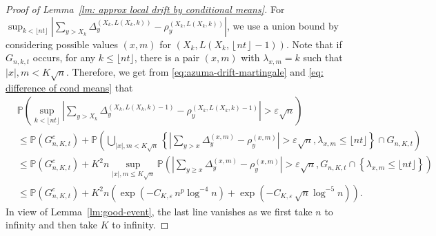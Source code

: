 \documentclass[EJP]{ejpecp} %
\newcommand{\abs}[1]{\left\vert #1 \right\vert}
\begin{document}
\begin{proof}[Proof of Lemma~\ref{lm: approx local drift by conditional means}]
For $\sup_{k <\lfloor nt \rfloor} \left| \sum_{y > X_k} \Delta_y^{\left(X_k,L(X_k, k)\right)} - \rho_y^{\left(X_k,L(X_k, k)\right)} \right|$, we use a union bound by considering possible values $(x,m)$ for $\left(X_k, L\left(X_k, \left\lfloor nt  \right\rfloor - 1\right)\right)$. Note that if $G_{n,k,t}$ occurs, for any $k\leq \lfloor nt \rfloor$, there is a pair $(x,m)$ with $\lambda_{x,m}=k$ such that $\abs{x},m <K\sqrt{n}$. Therefore, we get from \eqref{eq:azuma-drift-martingale} and \eqref{eq: difference of cond means} that 
\begin{align*}
	& \mathbb{P}\left( \sup_{k <\lfloor nt \rfloor} \left| \sum_{y > X_k} 
	\Delta_y^{\left(X_k,L(X_k, k)-1\right)} - \rho_y^{\left(X_k,L(X_k, k)-1\right)}
	\right| > \varepsilon \sqrt{n}  \right) \\
	&\le \mathbb{P}(G_{n, K, t}^c) + \mathbb{P}\left( \bigcup_{|x|, m < K \sqrt{n} } \left\{  \left| \sum_{y > x} \Delta_y^{(x,m)} - \rho_y^{(x,m)} \right|  > \varepsilon \sqrt{n},  \lambda_{x,m} \leq\lfloor nt \rfloor \right\} \cap G_{n,K,t} \right) \\
	&\le \mathbb{P}(G_{n, K, t}^c) + K^2 n \sup _{|x|, m \le  K \sqrt{n} }
	\mathbb{P}\left( \left| \sum_{y \ge x} \Delta_y^{(x,m)} - \rho_y^{(x,m)} \right|  > \varepsilon \sqrt{n} , G_{n,K,t}\cap \left\{\lambda_{x,m} \leq\lfloor nt \rfloor \right\}  \right) \\
	&\le \mathbb{P}(G_{n, K, t}^c) + K^2 n \left( \exp\left( - C_{K, \varepsilon} \, n^{p } \log^{-4} n \right) + \exp\left( - C_{K, \varepsilon} \, \sqrt{n}  \log^{-5} n \right)\right) 
	.\end{align*}
In view of Lemma~\ref{lm:good-event}, the last line vanishes as we first take $n$ to infinity and then take $K$ to infinity.
\end{proof}



\end{document}
